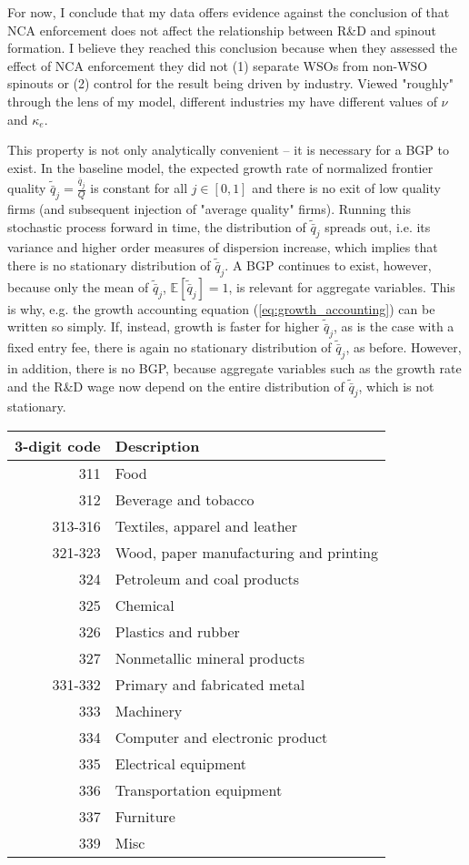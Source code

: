 For now, I conclude that my data offers evidence against the conclusion of \cite{babina_entrepreneurial_2019} that NCA enforcement does not affect the relationship between R\&D and spinout formation. I believe they reached this conclusion because when they assessed the effect of NCA enforcement they did not (1) separate WSOs from non-WSO spinouts or (2) control for the result being driven by industry. Viewed "roughly" through the lens of my model, different industries my have different values of $\nu$ and $\kappa_e$. 




This property is not only analytically convenient -- it is necessary for a BGP to exist. In the baseline model, the expected growth rate of normalized frontier quality $\tilde{\bar{q}}_j = \frac{\bar{q}_j}{Q}$ is constant for all $j \in [0,1]$ and there is no exit of low quality firms (and subsequent injection of "average quality" firms). Running this stochastic process forward in time, the distribution of $\tilde{\bar{q}}_j$ spreads out, i.e. its variance and higher order measures of dispersion increase, which implies that there is no stationary distribution of $\tilde{\bar{q}}_j$. A BGP continues to exist, however, because only the mean of $\tilde{\bar{q}}_j$, $\mathbb{E}[\tilde{\bar{q}}_j] = 1$, is relevant for aggregate variables. This is why, e.g. the growth accounting equation (\ref{eq:growth_accounting}) can be written so simply. If, instead, growth is faster for higher $\tilde{\bar{q}}_j$, as is the case with a fixed entry fee, there is again no stationary distribution of $\tilde{\bar{q}}_j$, as before. However, in addition, there is no BGP, because aggregate variables such as the growth rate and the R\&D wage now depend on the entire distribution of $\tilde{\bar{q}}_j$, which is not stationary.


\begin{table}[]
	\centering
	\label{}
	\begin{tabular}{rl}
		\toprule \toprule
		3-digit code & Description \tabularnewline
		\midrule
		311 & Food \tabularnewline 
		312 & Beverage and tobacco  \tabularnewline 
		313-316 & Textiles, apparel and leather  \tabularnewline
		321-323 & Wood, paper manufacturing and printing \tabularnewline  
		324 & Petroleum and coal products \tabularnewline
		325 & Chemical \tabularnewline
		326 & Plastics and rubber \tabularnewline
		327 & Nonmetallic mineral products \tabularnewline 
		331-332 & Primary and fabricated metal  \tabularnewline
		333 & Machinery \tabularnewline
		334 & Computer and electronic product \tabularnewline
		335 & Electrical equipment \tabularnewline
		336 & Transportation equipment \tabularnewline
		337 & Furniture \tabularnewline
		339 & Misc \tabularnewline
		\bottomrule
	\end{tabular}
\end{table}


